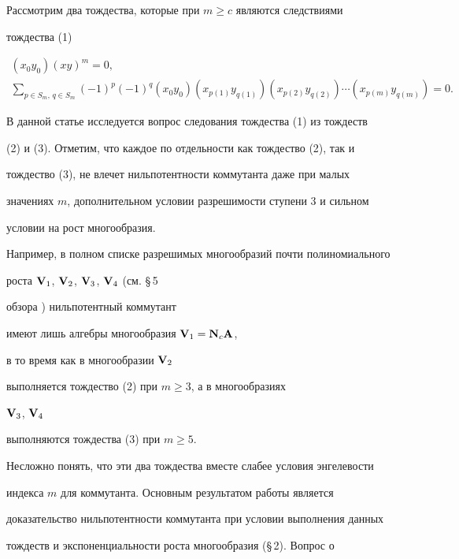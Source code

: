 Рассмотрим два тождества, которые при $m\ge c$ являются следствиями


тождества (1)


\begin{gather}


(x_0y_0)(xy)^m=0, \\


\sum_{p\in S_m,\,q\in S_m}(-1)^p(-1)^q(x_0y_0)


(x_{p(1)}y_{q(1)})(x_{p(2)}y_{q(2)})\dotsb


(x_{p(m)}y_{q(m)})=0.


\end{gather}





В данной статье исследуется вопрос следования тождества (1) из тождеств


(2) и (3). Отметим, что каждое по отдельности как тождество (2), так и


тождество (3), не влечет нильпотентности коммутанта даже при малых


значениях $m$, дополнительном условии разрешимости ступени 3 и сильном


условии на рост многообразия.





Например, в полном списке разрешимых многообразий почти полиномиального


роста $\bold V_1$, $\bold V_2$, $\bold V_3$, $\bold V_4$ (см. \S\,5


обзора \cite{2}) нильпотентный коммутант


имеют лишь алгебры многообразия $\bold V_1=\bold N_c\bold A$,


в то время как в многообразии $\bold V_2$


выполняется тождество (2) при $m\ge 3$, а в многообразиях


$\bold V_3$, $\bold V_4$


выполняются тождества (3) при $m\ge 5$.





Несложно понять, что эти два тождества вместе слабее условия энгелевости


индекса $m$ для коммутанта. Основным результатом работы является


доказательство нильпотентности коммутанта при условии выполнения данных


тождеств и экспоненциальности роста многообразия (\S\,2). Вопрос о


